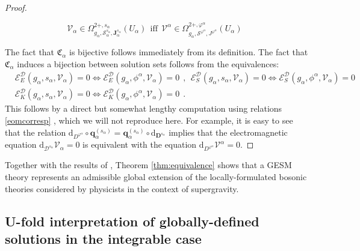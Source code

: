 \documentclass[10pt, cmp, numbook, final, a4paper]{svjour}
\newcommand*{\SavedEqref}{}
\let\SavedEqref\eqref
\renewcommand*{\eqref}[1]{%
  \begingroup
    \hypersetup{
      linkcolor=blue,
      linkbordercolor=blue,
    }%
    \SavedEqref{#1}%
  \endgroup
}
\def\bD{\mathbb{D}}
\def\dd{\mathrm{d}}
\def\bcD{\boldsymbol{\mathcal{D}}}
\def\bJ{\mathbf{J}}
\def\bJ{\mathbf{J}}
\newcommand{\ben}{\begin{equation}}
\newcommand{\een}{\end{equation}}
\newcommand{\beqan}{\begin{eqnarray}}
\newcommand{\eeqan}{\end{eqnarray}}
\newcommand{\nn}{\nonumber}
\def\cD{\mathcal{D}}
\def\cE{\check{E}}
\def\cS{\mathcal{S}}
\def\cV{\mathcal{V}}
\def\cE{\mathcal{E}}
\def\bD{\mathbf{D}}
\def\bcS{\boldsymbol{\mathcal{S}}}
\def\bD{\mathbf{D}}
\def\mq{\mathbf{q}}
\def\bcV{\boldsymbol{\cV}}
\begin{document}
\begin{proof}
\begin{itemize}
\ben
\label{eomcorresp}
\bcV_\alpha\in \Omega^{2+,s_\alpha}_{g_\alpha, \bcS^{s_\alpha}_{\alpha},\bJ^{s_\alpha}_{\alpha}}(U_\alpha)~~\mathrm{iff}~~ \cV^{\alpha}\in \Omega^{2+,\varphi^{\alpha}}_{g_{\alpha},\cS^{\varphi^{\alpha}},J^{\varphi^{\alpha}}}(U_\alpha)~~
\een
\end{itemize}
\noindent
The fact that $\mathfrak{C}_\alpha$ is bijective follows immediately
from its definition.  The fact that $\mathfrak{C}_{\alpha}$ induces a
bijection between solution sets follows from the equivalences:
\beqan
\label{equiv}
& \cE^{\bcD}_{E}(g_{\alpha},s_{\alpha},\bcV_{\alpha}) = 0\Leftrightarrow \cE^{\cD}_{E}(g_{\alpha},\phi^\alpha,\cV_\alpha)=0~~,~~\cE^{\bcD}_{S}(g_{\alpha},s_{\alpha},\bcV_{\alpha}) = 0\Leftrightarrow 
\cE^{\cD}_{S}(g_{\alpha},\phi^\alpha,\cV_\alpha)=0 \nn \\ 
& \cE^{\bcD}_{K}(g_{\alpha},s_{\alpha},\bcV_{\alpha}) = 0\Leftrightarrow \cE^{\cD}_{K}(g_{\alpha},\phi^\alpha,\cV_\alpha)=0~~.
\eeqan
This follows by a direct but somewhat lengthy computation using
relations \eqref{eomcorresp}, which we will not reproduce here. For
example, it is easy to see that the relation
$\dd_{D^{\varphi^{\alpha}}}\circ\mq_\alpha^{(s_\alpha)}=\mq_\alpha^{(s_\alpha)}\circ\dd_{\bD^{s_\alpha}}$
implies that the electromagnetic equation
$\dd_{\bcD^{s_\alpha}}\bcV_\alpha=0$ is equivalent with the equation
$\dd_{D^{\varphi^{\alpha}}}\cV^{\alpha}=0$.
\end{proof}

\begin{remark}
Together with the results of \cite{GESM}, Theorem
\ref{thm:equivalence} shows that a GESM theory represents an
admissible global extension of the locally-formulated bosonic theories
considered by physicists in the context of supergravity.
\end{remark}

\subsection{U-fold interpretation of globally-defined solutions in the integrable case}
\label{section:Ufoldint}
\end{document}
